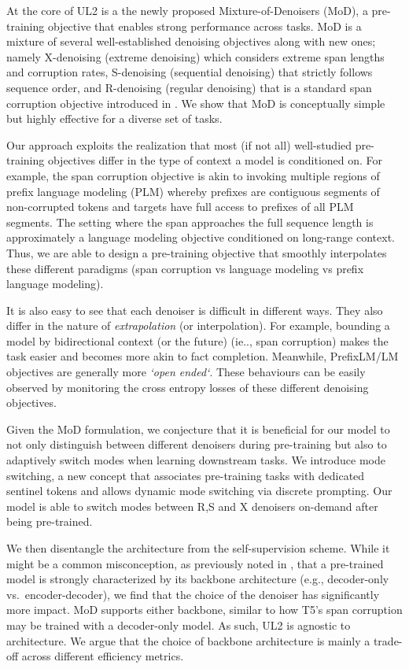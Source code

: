 \documentclass[10pt]{article}
\begin{document}
At the core of UL2 is a the newly proposed Mixture-of-Denoisers (MoD), a pre-training objective that enables strong performance across tasks. MoD is a mixture of several well-established denoising objectives along with new ones; namely X-denoising (extreme denoising) which considers extreme span lengths and corruption rates, S-denoising (sequential denoising) that strictly follows sequence order, and R-denoising (regular denoising) that is a standard span corruption objective introduced in \citep{raffel2019exploring}. We show that MoD is conceptually simple but highly effective for a diverse set of tasks.

Our approach exploits the realization that most (if not all) well-studied pre-training objectives differ in the type of context a model is conditioned on. For example, the span corruption objective is akin to invoking multiple regions of prefix language modeling (PLM)  \citep{liu2018generating,raffel2019exploring} whereby prefixes are contiguous segments of non-corrupted tokens and targets have full access to prefixes of all PLM segments. The setting where the span approaches the full sequence length is approximately a language modeling objective conditioned on long-range context. Thus, we are able to design a pre-training objective that smoothly interpolates these different paradigms (span corruption vs language modeling vs prefix language modeling). 

It is also easy to see that each denoiser is difficult in different ways. They also differ in the nature of \textit{extrapolation} (or interpolation). For example, bounding a model by bidirectional context (or the future) (ie.., span corruption) makes the task easier and becomes more akin to fact completion. Meanwhile, PrefixLM/LM objectives are generally more \textit{`open ended`}. These behaviours can be easily observed by monitoring the cross entropy losses of these different denoising objectives. 

Given the MoD formulation, we conjecture that it is beneficial for our model to not only distinguish between different denoisers during pre-training but also to adaptively switch modes when learning downstream tasks. We introduce mode switching, a new concept that associates pre-training tasks with dedicated sentinel tokens and allows dynamic mode switching via discrete prompting. Our model is able to switch modes between R,S and X denoisers on-demand after being pre-trained.


We then disentangle the architecture from the self-supervision scheme. While it might be a common misconception, as previously noted in \citet{raffel2019exploring}, that a pre-trained model is strongly characterized by its backbone architecture (e.g., decoder-only vs.\ encoder-decoder), we find that the choice of the denoiser has significantly more impact. MoD supports either backbone, similar to how T5's span corruption may be trained with a decoder-only model. As such, UL2 is agnostic to architecture. We argue that the choice of backbone architecture is mainly a trade-off across different efficiency metrics.
\end{document}
